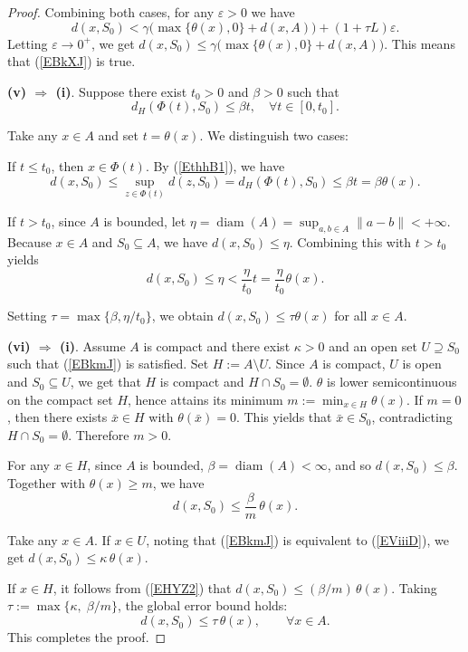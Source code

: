 \documentclass[11pt]{article}
\begin{document}
\begin{proof}
	Combining both cases, for any $\varepsilon>0$ we have
	\[
	d(x,S_0) < \gamma\bigl(\max\{\theta(x),0\}+d(x, A) \bigr) + (1+\tau L)\varepsilon.
	\]
	Letting $\varepsilon\to0^+$, we get
	$	d(x,S_0) \le \gamma\bigl(\max\{\theta(x),0\}+d(x, A) \bigr).	$
	This means that (\ref{EBkXJ}) is true.
	
	
	\noindent\textbf{(v) $\Rightarrow$ (i)}.
	Suppose there exist \(t_0 > 0\) and \(\beta > 0\) such that 
	\begin{equation}\label{EthhB1}
		d_H(\Phi(t), S_0) \le \beta t,  \quad  \forall t \in [0, t_0].
	\end{equation}
	
	
	Take any \(x \in A\) and set \(t = \theta(x)\). We distinguish two cases:
	
	If \(t \le t_0\), then \(x \in \Phi(t)\). By   (\ref{EthhB1}),  we have 
	\[
	d(x, S_0) \le \sup_{z \in \Phi(t)} d(z, S_0) = d_H(\Phi(t), S_0) \le \beta t = \beta \theta(x).
	\]
	
	If \(t > t_0\), since \(A\) is bounded, let \(\eta = \operatorname{diam}(A) = \sup_{a,b \in A} \|a - b\| < +\infty\). Because \(x \in A\) and \(S_0 \subseteq A\), we have \(d(x, S_0) \le \eta\). Combining this with \(t > t_0\) yields
	\[
	d(x, S_0) \le \eta < \frac{\eta}{t_0} t = \frac{\eta}{t_0} \theta(x).
	\]
	
	Setting \(\tau = \max\{\beta, \eta/t_0\}\), we obtain \(d(x, S_0) \le \tau \theta(x)\) for all \(x \in A\). 
	
	
	
	\noindent\textbf{(vi) $\Rightarrow$ (i)}.
	Assume $A$ is compact   and there exist $\kappa>0$ and an open set $U\supseteq S_0$ such that
	(\ref{EBkmJ})  is satisfied.   
	Set $H:=A\setminus U$.   Since   $A$ is compact, $U$ is open and $S_0 \subseteq U$,  we get that  $H$ is compact   and $H\cap S_0= \emptyset$.
	$\theta$ is lower semicontinuous   on the compact set $H$, hence attains its minimum $m:=\min_{x\in H}\theta(x)$.
	If $m=0$, then there exists $\bar x\in H$ with $\theta(\bar x)=0$. This yields   that   $\bar x\in S_0$, contradicting $H\cap S_0= \emptyset$. Therefore $m>0$.
	
	For any $x\in H$, since $A$ is bounded, $\beta =\operatorname{diam}(A)<\infty$, and so $d(x,S_0)\le \beta$. Together with $\theta(x)\ge m$, we have 
	\begin{equation} \label{EHYZ2}
		d(x,S_0)\le \frac{\beta}{m}\,\theta(x).  
	\end{equation}
	
	Take any $x\in A$.  If $x\in U$, noting that  (\ref{EBkmJ})  is  equivalent to (\ref{EViiiD}), we get  
	$d(x,S_0)\le\kappa\,\theta(x)$.
	
	If $x\in H$,  it follows from  (\ref{EHYZ2}) that $d(x,S_0)\le (\beta/m)\,\theta(x)$.
	Taking $\tau:=\max\{\kappa,\; \beta/m\}$, the global error bound holds:
	\[
	d(x,S_0)\le\tau\,\theta(x),\qquad \forall x\in A.
	\]
	This completes the proof. 
\end{proof}
\end{document}

